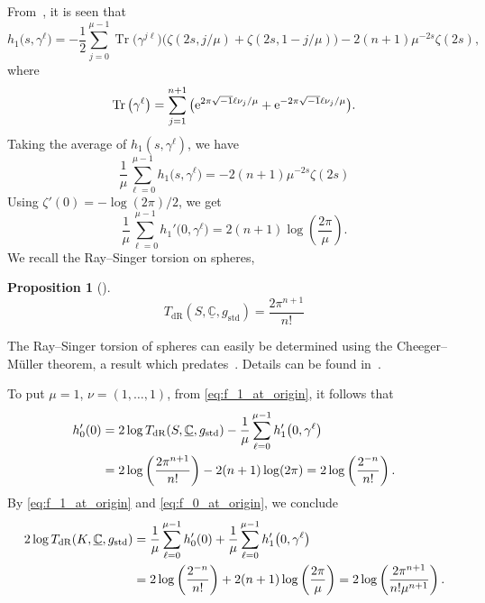 \documentclass[pdftex]{sigma}
\numberwithin{equation}{section}
\newtheorem{Proposition}[Theorem]{Proposition}
 { \theoremstyle{definition}
\newtheorem{Definition}[Theorem]{Definition}
\newtheorem{Note}[Theorem]{Note}
\newtheorem{Example}[Theorem]{Example}
\newtheorem{Remark}[Theorem]{Remark} }
\DeclareMathOperator{\Tr}{Tr}
\newcommand{\ii}{\sqrt{-1}}
\newcommand{\deRham}{\mathrm{dR}}
\newcommand{\bC}{\mathbb{C}}
\begin{document}
From~\cite[p.~125]{Ray-70},
it is seen that
\begin{equation*}
 h_1 \big(s , \gamma^{\ell}\big)
 =
 - \frac{1}{2}
 \sum_{j=0}^{\mu -1}
 \Tr \big(\gamma^{j \ell}\big)
 \bigl(
 \zeta (2s , j /\mu)
 +
 \zeta (2s , 1- j /\mu)
 \bigr)
 -
 2 (n+1) \mu^{-2s} \zeta (2s)
 ,
\end{equation*}
where
\[
 \Tr \big(\gamma^{\ell}\big) =
 \sum_{j=1}^{n+1}
 \big(
 {\rm e}^{2 \pi \ii \ell \nu_j / \mu} + {\rm e}^{-2 \pi \ii \ell \nu_j / \mu}
 \big)
 .
\]
Taking the average of $h_1 (s , \gamma^{\ell})$, we have
\[
 \frac{1}{\mu} \sum_{\ell = 0}^{\mu-1} h_1 \big(s , \gamma^{\ell}\big)
 =
 - 2 (n+1)
 \mu^{-2s} \zeta (2s)
\]
Using $\zeta '(0) = - \log (2 \pi) /2$, we get
\begin{equation}
 \frac{1}{\mu} \sum_{\ell = 0}^{\mu-1} h_1 ' \big(0 , \gamma^{\ell}\big)
 = 2 (n+1) \log \left( \frac{2 \pi}{ \mu} \right)
 .
 \label{eq:f_1_at_origin}
\end{equation}
We recall the Ray--Singer torsion on spheres,
\begin{Proposition}[{\cite{Weng-You-96}}]
 \label{prop:Weng-You}
 \[
 T_{\deRham} (S, \underline{\bC} , g_{\mathrm{std}})
 = \frac{2 \pi^{n+1}}{n!}
 \]
\end{Proposition}
\begin{Remark}
 The Ray--Singer torsion of spheres can easily be determined using the Cheeger--M\"uller theorem, a result which predates~\cite{Weng-You-96}.
 Details can be found in~\cite{Melo-Spreafico-09}.
\end{Remark}
To put $\mu =1$, $\nu = (1 , \ldots , 1)$, from \eqref{eq:f_1_at_origin}, it follows that
\begin{align}
 h_0' (0)
 & =
 2 \log T_{\deRham} (S, \underline{\bC} , g_{\mathrm{std}})
 - \frac{1}{\mu} \sum_{\ell = 0}^{\mu-1} h_1 ' \big(0 , \gamma^{\ell}\big)
 \notag \\
 & =
 2 \log \left( \frac{2 \pi^{n+1}}{ n!} \right)
 - 2 (n+1) \log ( 2 \pi )
 = 2 \log \left( \frac{2^{-n}}{ n!} \right)
 .
 \label{eq:f_0_at_origin}
\end{align}
By \eqref{eq:f_1_at_origin} and \eqref{eq:f_0_at_origin},
we conclude
\begin{align}
 2 \log T_{\deRham} (K, \underline{\bC} , g_{\mathrm{std}})
 & =
 \frac{1}{\mu} \sum_{\ell = 0}^{\mu -1} h_0 ' (0 )
 + \frac{1}{\mu} \sum_{\ell = 0}^{\mu -1} h_1 ' \big(0 , \gamma^{\ell}\big)
 \notag \\
 & = 2 \log \left( \frac{2^{-n}}{n!} \right) + 2 (n+1) \log \left( \frac{2 \pi}{\mu} \right)
 = 2 \log \left( \frac{2 \pi^{n+1}}{ n! \mu^{n+1}} \right)
 .
 \label{eq:pre_Proposition_trivial_bundle}
\end{align}
\end{document}
